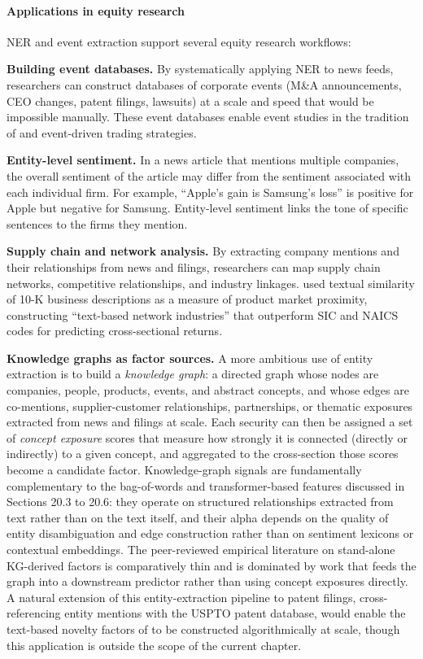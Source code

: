 \paragraph{Applications in equity research}

NER and event extraction support several equity research workflows:

\textbf{Building event databases.} By systematically applying NER to news feeds, researchers can construct databases of corporate events (M\&A announcements, CEO changes, patent filings, lawsuits) at a scale and speed that would be impossible manually. These event databases enable event studies in the tradition of \cite{mackinlay1997event} and event-driven trading strategies.

\textbf{Entity-level sentiment.} In a news article that mentions multiple companies, the overall sentiment of the article may differ from the sentiment associated with each individual firm. For example, ``Apple's gain is Samsung's loss'' is positive for Apple but negative for Samsung. Entity-level sentiment links the tone of specific sentences to the firms they mention.

\textbf{Supply chain and network analysis.} By extracting company mentions and their relationships from news and filings, researchers can map supply chain networks, competitive relationships, and industry linkages. \cite{hoberg2016text} used textual similarity of 10-K business descriptions as a measure of product market proximity, constructing ``text-based network industries'' that outperform SIC and NAICS codes for predicting cross-sectional returns.

\textbf{Knowledge graphs as factor sources.} A more ambitious use of entity extraction is to build a \textit{knowledge graph}: a directed graph whose nodes are companies, people, products, events, and abstract concepts, and whose edges are co-mentions, supplier-customer relationships, partnerships, or thematic exposures extracted from news and filings at scale. Each security can then be assigned a set of \textit{concept exposure} scores that measure how strongly it is connected (directly or indirectly) to a given concept, and aggregated to the cross-section those scores become a candidate factor. Knowledge-graph signals are fundamentally complementary to the bag-of-words and transformer-based features discussed in Sections 20.3 to 20.6: they operate on structured relationships extracted from text rather than on the text itself, and their alpha depends on the quality of entity disambiguation and edge construction rather than on sentiment lexicons or contextual embeddings. The peer-reviewed empirical literature on stand-alone KG-derived factors is comparatively thin and is dominated by work that feeds the graph into a downstream predictor rather than using concept exposures directly. A natural extension of this entity-extraction pipeline to patent filings, cross-referencing entity mentions with the USPTO patent database, would enable the text-based novelty factors of \cite{kogan2017technological} to be constructed algorithmically at scale, though this application is outside the scope of the current chapter.

